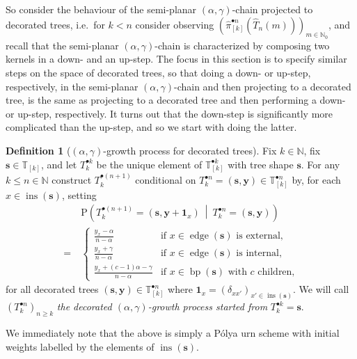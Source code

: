 \documentclass[a4paper, final]{amsart}
\theoremstyle{plain}
\theoremstyle{definition}
\newtheorem{defi}[thm]{Definition}
\newcommand{\tree}[1][t]{\boldsymbol{#1}}
\newcommand{\That}[1][T]{\widehat{#1}}
\newcommand{\T}{\mathbb{T}}
\DeclareMathOperator{\edge}{edge}
\DeclareMathOperator{\insertable}{ins}
\DeclareMathOperator{\branchpoints}{bp}
\newcommand{\insertablef}[1][\tree]{\insertable({\tree[#1]})}
\renewcommand{\P}{\mathrm{P}}
\newcommand{\N}{\mathbb{N}}
\begin{document}
So consider the behaviour of the semi-planar $(\alpha, \gamma)$-chain projected to decorated trees, i.e.\ for $k < n$ consider observing ${\left( \hat{\pi}_{[k]}^{\bullet n} \left( \That_n(m) \right) \right)}_{m \in \N_0}$, and recall that the semi-planar $(\alpha, \gamma)$-chain is characterized by composing two kernels in a down- and an up-step.
The focus in this section is to specify similar steps on the space of decorated trees, so that doing a down- or up-step, respectively, in the semi-planar $(\alpha, \gamma)$-chain and then projecting to a decorated tree, is the same as projecting to a decorated tree and then performing a down- or up-step, respectively.
It turns out that the down-step is significantly more complicated than the up-step, and so we start with doing the latter.
%
\begin{defi}[$(\alpha, \gamma)$-growth process for decorated trees]
\label{def:decorated_alphagamma_growth}
  Fix $k \in \N$, fix $\tree[s] \in \T_{[k]}$, and let $T_k^{\bullet k}$ be the unique element of $\T_{[k]}^{\bullet k}$ with tree shape $\tree[s]$.
  For any $k \leq n \in \N$ construct $T_k^{\bullet (n+1)}$ conditional on $T_k^{\bullet n} = (\tree[s], \mathbf{y}) \in \T_{[k]}^{\bullet n}$ by, for each $x \in \insertablef[s]$, setting
  \begin{align*}
    &\P \left( T_k^{\bullet (n+1)} = (\tree[s], \mathbf{y} + \mathbf{1}_x) \ \middle \vert \ T_k^{\bullet n} = (\tree[s], \mathbf{y}) \right) \\
    =\ 
    &\begin{cases}
      \frac{y_x - \alpha}{n - \alpha} & \text{if $x \in \edge(\tree[s])$ is external,} \\
      \frac{y_x + \gamma}{n - \alpha} & \text{if $x \in \edge(\tree[s])$ is internal,} \\
      \frac{y_x + (c - 1) \alpha - \gamma}{n - \alpha} & \text{if $x \in \branchpoints(\tree[s])$ with $c$ children,}
      \end{cases}
  \end{align*}
  for all decorated trees $(\tree[s], \mathbf{y}) \in \T_{[k]}^{\bullet n}$ where $\mathbf{1}_x = {\left( \delta_{xx'} \right)}_{x' \in \insertablef[s]}$.
We will call ${\left( T_k^{\bullet n} \right)}_{n \geq k}$ \textit{the decorated $(\alpha, \gamma)$-growth process started from} $T_k^{\bullet k} = \tree[s]$.
\end{defi}
%
We immediately note that the above is simply a P\'{o}lya urn scheme with initial weights labelled by the elements of $\insertablef[s]$.
\end{document}
